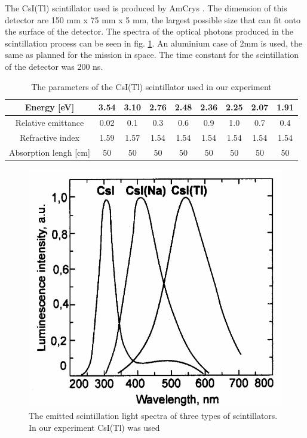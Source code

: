 \documentclass[12pt, a4paper,titlepage]{article}
\numberwithin{equation}{section}
\numberwithin{figure}{section}
\begin{document}
The CsI(Tl) scintillator used is produced by AmCrys \cite{scinti}. The dimension of this detector are 150 mm x 75 mm x 5 mm, the largest possible size that can fit onto the surface of the detector. The spectra of the optical photons produced in the scintillation process can be seen in fig. \ref{fig:scint_yield}. An aluminium case of 2mm is used, the same as planned for the mission in space. The time constant for the scintillation of the detector was 200 ns.

\begin{table}[h!]
\begin{center}
\begin{tabular}{ |c|c|c|c|c|c|c|c|c|} 
 \hline
 Energy [eV] & 3.54 & 3.10 & 2.76 & 2.48 & 2.36 & 2.25 & 2.07 & 1.91\\\hline
 Relative emittance & 0.02 & 0.1 & 0.3 & 0.6 & 0.9 & 1.0 & 0.7 & 0.4 \\\hline
 Refractive index & 1.59 & 1.57 & 1.54 & 1.54 & 1.54 & 1.54 & 1.54 & 1.54 \\\hline
 Absorption lengh [cm] & 50 & 50 & 50 & 50 & 50 & 50 & 50 & 50  \\\hline
\end{tabular}
\end{center}
\caption{The parameters of the CsI(Tl) scintillator used in our experiment}
\end{table}


\begin{figure}[H]
\centering
\includegraphics[width=130.0mm]{images/spectracsitl.png}
\caption{The emitted scintillation light spectra of three types of scintillators. In our experiment CsI(Tl) was used}
\label{fig:scint_yield}
\end{figure}
\end{document}
